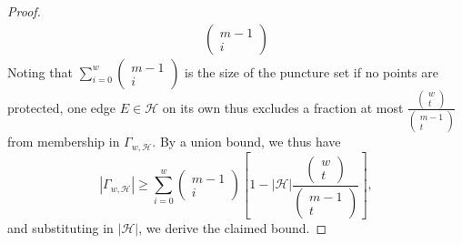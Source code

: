 \documentclass[10pt,a4paper]{amsart}
\begin{document}
\begin{proof}
\begin{align}
\begin{pmatrix}
            m-1\\i
        \end{pmatrix}
    \end{align}
    Noting that $\sum_{i=0}^w\left(\begin{smallmatrix}m-1\\i\end{smallmatrix}\right)$ is the size of the puncture set if no points are protected, one edge $E \in \mathcal{H}$ on its own thus excludes a fraction at most $\frac{\left(\begin{smallmatrix}w\\t\end{smallmatrix}\right)}{\left(\begin{smallmatrix}m-1\\t\end{smallmatrix}\right)}$ from membership in $\Gamma_{w,\mathcal{H}}$. By a union bound, we thus have
    \begin{equation}
        |\Gamma_{w,\mathcal{H}}| \geq \sum_{i=0}^w\begin{pmatrix}
            m-1\\i
        \end{pmatrix}\left[1-|\mathcal{H}|\frac{\begin{pmatrix}
            w\\t
        \end{pmatrix}}{\begin{pmatrix}
            m-1\\t
        \end{pmatrix}}\right],
    \end{equation}
    and substituting in $|\mathcal{H}|$, we derive the claimed bound.
\end{proof}
\end{document}
